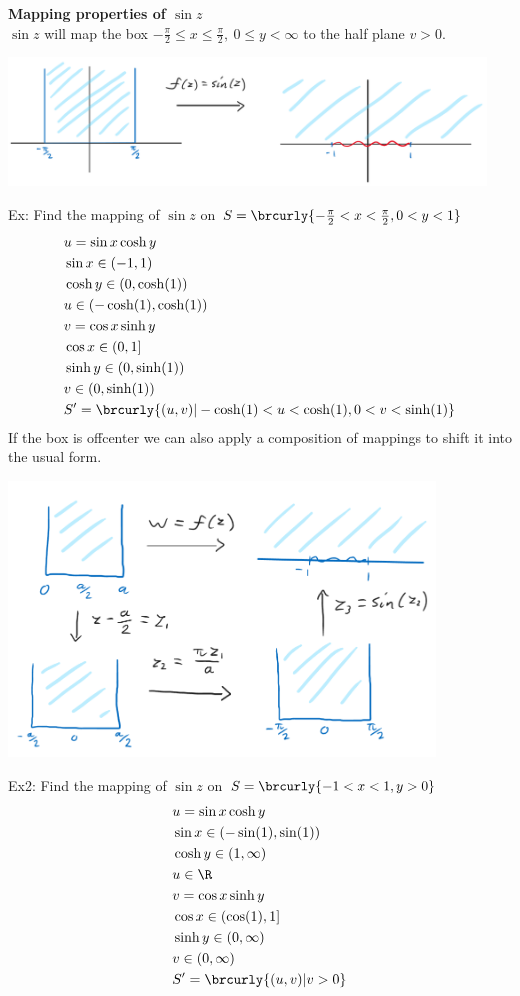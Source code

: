 \textbf{Mapping properties of $\sin z$}\\
$\sin z$ will map the box $-\frac{\pi}{2}\leq x\leq\frac{\pi}{2},\ 0\leq y<\infty$ to the half plane $v>0$.\\
\centerline{\includegraphics[width=0.95\textwidth]{Images/ComplexAnalysisPictures/SinMapping.png}}
Ex: Find the mapping of $\sin z$ on $S=\brcurly{-\frac{\pi}{2}<x<\frac{\pi}{2},0<y<1}$
\begin{align*}
    &u=\sin x\cosh y\\
    &\sin x\in(-1,1)\\
    &\cosh y \in (0,\cosh(1))\\
    &u\in (-\cosh(1),\cosh(1))\\
    &v=\cos x\sinh y\\
    &\cos x\in (0,1]\\
    &\sinh y\in (0,\sinh(1))\\
    &v\in(0,\sinh(1))\\
    &S'=\brcurly{(u,v)|-\cosh(1)<u<\cosh(1),0<v<\sinh(1)}
\end{align*}
If the box is offcenter we can also apply a composition of mappings to shift it into the usual form.\\
\centerline{\includegraphics[width=0.85\textwidth]{Images/ComplexAnalysisPictures/TranslateSinMap.png}}
Ex2: Find the mapping of $\sin z$ on $S=\brcurly{-1<x<1,y>0}$
\begin{align*}
    &u=\sin x\cosh y\\
    &\sin x \in(-\sin(1),\sin(1))\\
    &\cosh y\in (1,\infty)\\
    &u\in \R\\
    &v=\cos x\sinh y\\
    &\cos x\in (\cos(1),1]\\
    &\sinh y \in (0,\infty)\\
    &v\in (0,\infty)\\
    &S'=\brcurly{(u,v)|v>0}
\end{align*}
